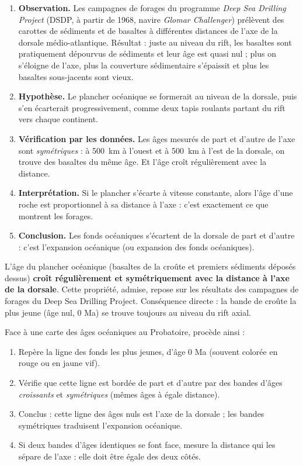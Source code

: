 \documentclass[11pt]{article}
\newcommand{\cle}[1]{{\popxbold\color{popdark}#1}}
\begin{document}
\begin{enumerate}
\item \textbf{Observation.} Les campagnes de forages du programme \emph{Deep Sea Drilling Project} (DSDP, à partir de 1968, navire \emph{Glomar Challenger}) prélèvent des carottes de sédiments et de basaltes à différentes distances de l'axe de la dorsale médio-atlantique. Résultat : juste au niveau du rift, les basaltes sont pratiquement dépourvus de sédiments et leur âge est quasi nul ; plus on s'éloigne de l'axe, plus la couverture sédimentaire s'épaissit et plus les basaltes sous-jacents sont vieux.
\item \textbf{Hypothèse.} Le plancher océanique se formerait au niveau de la dorsale, puis s'en écarterait progressivement, comme deux tapis roulants partant du rift vers chaque continent.
\item \textbf{Vérification par les données.} Les âges mesurés de part et d'autre de l'axe sont \emph{symétriques} : à \SI{500}{km} à l'ouest et à \SI{500}{km} à l'est de la dorsale, on trouve des basaltes du même âge. Et l'âge croît régulièrement avec la distance.
\item \textbf{Interprétation.} Si le plancher s'écarte à vitesse constante, alors l'âge d'une roche est proportionnel à sa distance à l'axe : c'est exactement ce que montrent les forages.
\item \textbf{Conclusion.} Les fonds océaniques s'écartent de la dorsale de part et d'autre : c'est l'\cle{expansion océanique} (ou expansion des fonds océaniques).
\end{enumerate}

\begin{propriete}
L'âge du plancher océanique (basaltes de la croûte et premiers sédiments déposés dessus) \textbf{croît régulièrement et symétriquement avec la distance à l'axe de la dorsale}. Cette propriété, admise, repose sur les résultats des campagnes de forages du Deep Sea Drilling Project. Conséquence directe : la bande de croûte la plus jeune (âge nul, 0 Ma) se trouve toujours au niveau du rift axial.
\end{propriete}

\begin{methode}
Face à une carte des âges océaniques au Probatoire, procède ainsi :
\begin{enumerate}
\item Repère la ligne des fonds les plus jeunes, d'âge 0 Ma (souvent colorée en rouge ou en jaune vif).
\item Vérifie que cette ligne est bordée de part et d'autre par des bandes d'âges \emph{croissants} et \emph{symétriques} (mêmes âges à égale distance).
\item Conclus : cette ligne des âges nuls est l'axe de la dorsale ; les bandes symétriques traduisent l'expansion océanique.
\item Si deux bandes d'âges identiques se font face, mesure la distance qui les sépare de l'axe : elle doit être égale des deux côtés.
\end{enumerate}
\end{methode}
\end{document}
